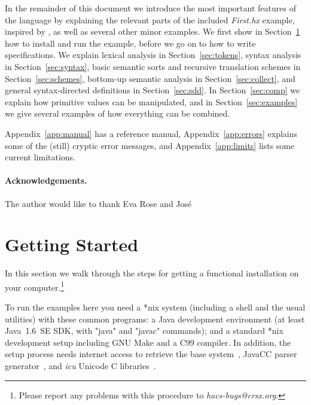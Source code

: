 \documentclass[11pt]{article} %
\begin{document}
In the remainder of this document we introduce the most important features of the \HAX language by
explaining the relevant parts of the included \emph{First.hx} example, inspired by
\cite[Figure~1.7]{Aho+:2006}, as well as several other minor examples. %
We first show in Section~\ref{sec:run} how to install \HAX and run the example, before we go on to
how to write specifications. %
We explain lexical analysis in Section~\ref{sec:tokens}, %
syntax analysis in Section~\ref{sec:syntax}, %
basic semantic sorts and recursive translation schemes in Section~\ref{sec:schemes}, %
bottom-up semantic analysis in Section~\ref{sec:collect}, %
and general syntax-directed definitions in Section~\ref{sec:sdd}. %
In Section~\ref{sec:comp} we explain how primitive values can be manipulated, %
and in Section~\ref{sec:examples} we give several examples of how everything can be combined.

Appendix~\ref{app:manual} has a reference manual, %
Appendix~\ref{app:errors} explains some of the (still) cryptic error messages, %
and Appendix~\ref{app:limits} lists some current limitations.

\paragraph*{Acknowledgements.} The author would like to thank Eva Rose and José


\section{Getting Started}\label{sec:run}

In this section we walk through the steps for getting a functional \HAX installation on your
computer.\footnote{Please report any problems with this procedure to \emph{hacs-bugs@crsx.org}.}

\begin{requirements}
  To run the \HAX examples here you need a *nix system (including a shell and the usual utilities)
  with these common programs: a Java development environment (at least Java~1.6~SE SDK, with "java"
  and "javac" commands); and a standard *nix development setup including GNU Make and a C99
  compiler. In addition, the setup process needs internet access to retrieve the \CRSX base
  system~\cite{crsx}, JavaCC parser generator~\cite{JavaCC}, and \emph{icu} Unicode C
  libraries~\cite{ICU}.
\end{requirements}
\end{document}
